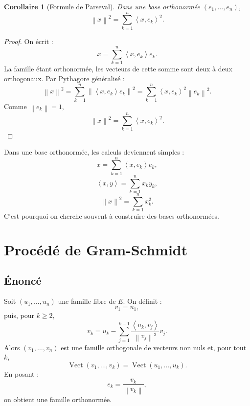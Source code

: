 \documentclass[11pt,a4paper]{article}
\newcommand{\Vect}{\operatorname{Vect}}
\newcommand{\norme}[1]{\left\lVert #1\right\rVert}
\newcommand{\scal}[2]{\left\langle #1,#2\right\rangle}
\newtheorem{corollaire}[prop]{Corollaire}
\begin{document}
\begin{corollaire}[Formule de Parseval]
Dans une base orthonormée \((e_1,\dots,e_n)\),
\[
\norme{x}^2
=
\sum_{k=1}^n\scal{x}{e_k}^2.
\]
\end{corollaire}

\begin{proof}
On écrit :
\[
x=\sum_{k=1}^n\scal{x}{e_k}e_k.
\]
La famille étant orthonormée, les vecteurs de cette somme sont deux à deux orthogonaux.  
Par Pythagore généralisé :
\[
\norme{x}^2
=
\sum_{k=1}^n\norme{\scal{x}{e_k}e_k}^2
=
\sum_{k=1}^n\scal{x}{e_k}^2\norme{e_k}^2.
\]
Comme \(\norme{e_k}=1\),
\[
\norme{x}^2
=
\sum_{k=1}^n\scal{x}{e_k}^2.
\]
\end{proof}

\begin{methodbox}
Dans une base orthonormée, les calculs deviennent simples :
\[
x=\sum_{k=1}^n \scal{x}{e_k}e_k,
\]
\[
\scal{x}{y}=\sum_{k=1}^n x_ky_k,
\]
\[
\norme{x}^2=\sum_{k=1}^n x_k^2.
\]
C'est pourquoi on cherche souvent à construire des bases orthonormées.
\end{methodbox}

\section{Procédé de Gram-Schmidt}

\subsection{Énoncé}

\begin{theorembox}
Soit \((u_1,\dots,u_n)\) une famille libre de \(E\).  
On définit :
\[
v_1=u_1,
\]
puis, pour \(k\geq2\),
\[
v_k
=
u_k
-
\sum_{j=1}^{k-1}
\frac{\scal{u_k}{v_j}}{\norme{v_j}^2}v_j.
\]
Alors \((v_1,\dots,v_n)\) est une famille orthogonale de vecteurs non nuls et, pour tout \(k\),
\[
\Vect(v_1,\dots,v_k)=\Vect(u_1,\dots,u_k).
\]
En posant :
\[
e_k=\frac{v_k}{\norme{v_k}},
\]
on obtient une famille orthonormée.
\end{theorembox}
\end{document}
